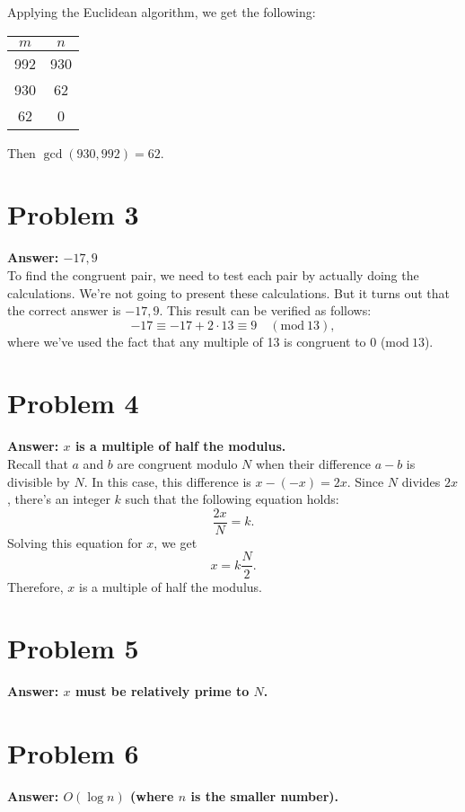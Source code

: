 \documentclass[11pt]{article}
\newcommand{\Mod}{\mathrm{mod}\:}
\begin{document}
Applying the Euclidean algorithm, we get the following:
\begin{center}
\begin{tabular}{|c|c|}
\hline
\(m\) & \(n\)\\
\hline
992 & 930\\
930 & 62\\
62 & 0\\
\hline
\end{tabular}
\end{center}
Then \(\gcd(930,992)=62\).
\section*{Problem 3}
\label{sec:org1cb3142}
\textbf{Answer: \(-17,9\)}\\

To find the congruent pair, we need to test each pair by actually doing the
calculations. We're not going to present these calculations. But it turns out
that the correct answer is \(-17,9\). This result can be verified as follows:
\begin{equation}
-17\equiv -17+2\cdot 13\equiv 9\quad(\Mod 13),
\end{equation}
where we've used the fact that any multiple of 13 is congruent to 0 (\(\Mod 13\)).
\section*{Problem 4}
\label{sec:orgc3d7c5a}
\textbf{Answer: \(x\) is a multiple of half the modulus.}\\

Recall that \(a\) and \(b\) are congruent modulo \(N\) when their
difference \(a-b\) is divisible by \(N\). In this case, this difference is
\(x-(-x)=2x\). Since \(N\) divides \(2x\), there's an integer \(k\) such
that the following equation holds:
\begin{equation}
\frac{2x}{N}=k.
\end{equation}
Solving this equation for \(x\), we get
\begin{equation}
x=k\frac{N}{2}.
\end{equation}
Therefore, \(x\) is a multiple of half the modulus.
\section*{Problem 5}
\label{sec:org9f8cd24}
\textbf{Answer: \(x\) must be relatively prime to \(N\).}
\section*{Problem 6}
\label{sec:orgbea2fab}
\textbf{Answer: \(O(\log n)\) (where \(n\) is the smaller number).}
\end{document}
